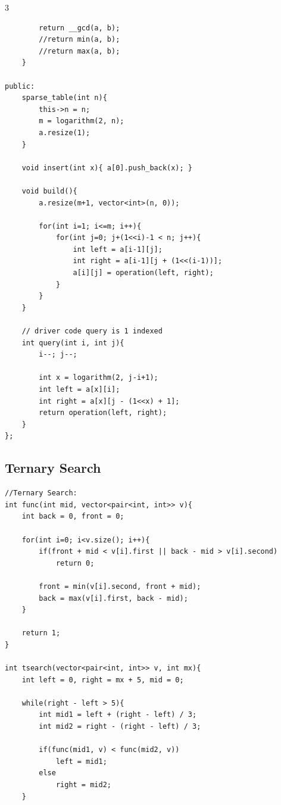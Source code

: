 \documentclass[twoside]{article}
\begin{document}
\begin{multicols*}{3}
\begin{verbatim}
        return __gcd(a, b);
        //return min(a, b);
        //return max(a, b);
    }

public:
    sparse_table(int n){
        this->n = n;
        m = logarithm(2, n);
        a.resize(1);
    }

    void insert(int x){ a[0].push_back(x); }

    void build(){
        a.resize(m+1, vector<int>(n, 0));

        for(int i=1; i<=m; i++){
            for(int j=0; j+(1<<i)-1 < n; j++){
                int left = a[i-1][j];
                int right = a[i-1][j + (1<<(i-1))];
                a[i][j] = operation(left, right);
            }
        }
    }

    // driver code query is 1 indexed
    int query(int i, int j){
        i--; j--;

        int x = logarithm(2, j-i+1);
        int left = a[x][i];
        int right = a[x][j - (1<<x) + 1];
        return operation(left, right);
    }
};

\end{verbatim}

{
\subsection*{Ternary Search}
}
\begin{verbatim}
//Ternary Search:
int func(int mid, vector<pair<int, int>> v){
    int back = 0, front = 0;
 
    for(int i=0; i<v.size(); i++){
        if(front + mid < v[i].first || back - mid > v[i].second)
            return 0;
 
        front = min(v[i].second, front + mid);
        back = max(v[i].first, back - mid);
    }
 
    return 1;
}

int tsearch(vector<pair<int, int>> v, int mx){
    int left = 0, right = mx + 5, mid = 0;

    while(right - left > 5){
        int mid1 = left + (right - left) / 3;
        int mid2 = right - (right - left) / 3;

        if(func(mid1, v) < func(mid2, v))
            left = mid1; 
        else 
            right = mid2; 
    }


\end{verbatim}
\end{multicols*}
\end{document}
